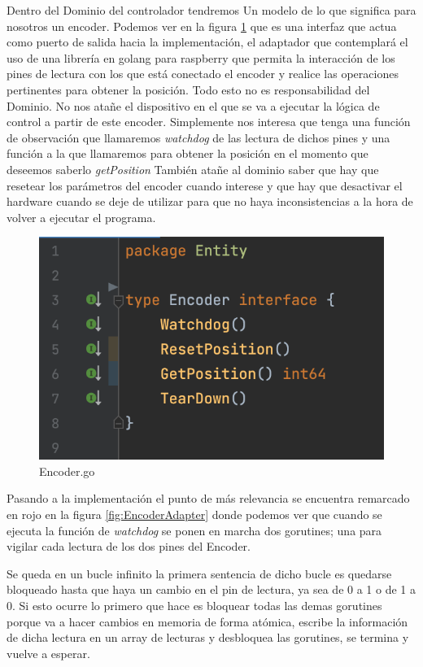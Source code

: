 Dentro del Dominio del controlador tendremos Un modelo de lo que significa para nosotros un encoder. Podemos ver en la figura \ref{fig:EncoderInterface} que es una interfaz que actua como puerto de salida hacia la implementación, el adaptador que contemplará el uso de una librería en golang para raspberry que permita la interacción de los pines de lectura con los que está conectado el encoder y realice las operaciones pertinentes para obtener la posición. Todo esto no es responsabilidad del Dominio. No nos atañe el dispositivo en el que se va a ejecutar la lógica de control a partir de este encoder. Simplemente nos interesa que tenga una función de observación que llamaremos \textit{watchdog} de las lectura de dichos pines y una función a la que llamaremos para obtener la posición en el momento que deseemos saberlo \textit{getPosition} También atañe al dominio saber que hay que resetear los parámetros del encoder cuando interese y que hay que desactivar el hardware cuando se deje de utilizar para que no haya inconsistencias a la hora de volver a ejecutar el programa.


\begin{figure}[H]
    \centering
    \includegraphics[height=0.2\textheight]{./part/Ejecucion/Seguimiento/Encoder/img/EncoderInterface}
    \caption{Encoder.go}\label{fig:EncoderInterface}
\end{figure}

Pasando a la implementación el punto de más relevancia se encuentra remarcado en rojo en la figura \ref{fig:EncoderAdapter} donde podemos ver que cuando se ejecuta la función de \textit{watchdog} se ponen en marcha dos gorutines; una para vigilar cada lectura de los dos pines del Encoder.

Se queda en un bucle infinito la primera sentencia de dicho bucle es quedarse bloqueado hasta que haya un cambio en el pin de lectura, ya sea de 0 a 1 o de 1 a 0. Si esto ocurre lo primero que hace es bloquear todas las demas gorutines porque va a hacer cambios en memoria de forma atómica, escribe la información de dicha lectura en un array de lecturas y desbloquea las gorutines, se termina y vuelve a esperar.

